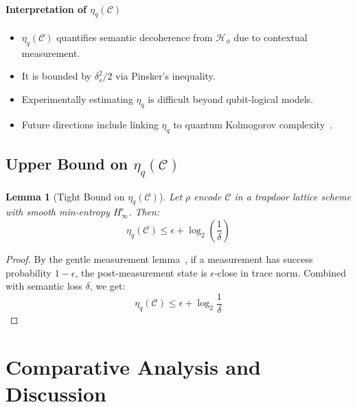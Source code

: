 \documentclass[preprint,12pt]{elsarticle}
\newtheorem{lemma}{Lemma}[section]
\begin{document}
            \paragraph{Interpretation of $\eta_q(\mathcal{C})$}
            \begin{itemize}
                \item $\eta_q(\mathcal{C})$ quantifies semantic decoherence from $\mathcal{H}_\phi$ due to contextual measurement.
                \item It is bounded by $\delta_s^2 / 2$ via Pinsker's inequality.
                \item Experimentally estimating $\eta_q$ is difficult beyond qubit-logical models.
                \item Future directions include linking $\eta_q$ to quantum Kolmogorov complexity~\cite{Berthiaume1997}.
            \end{itemize}

            \subsection{Upper Bound on $\eta_q(\mathcal{C})$}

            \begin{lemma}[Tight Bound on $\eta_q(\mathcal{C})$] \label{lem:tight_quantum_bound} 
                Let $\rho$ encode $\mathcal{C}$ in a trapdoor lattice scheme with smooth min-entropy $H_\infty^{\epsilon}$. Then:
                \begin{equation}\label{eq:tight_quantum_bound} 
                    \eta_q(\mathcal{C}) \leq \epsilon + \log_2 \left(\frac{1}{\delta}\right)
                \end{equation}
            \end{lemma}

            \begin{proof}\label{pr:tight_quantum_bound} 
                By the gentle measurement lemma~\cite{Wilde2017}, if a measurement has success probability $1-\epsilon$, the post-measurement state is $\epsilon$-close in trace norm. Combined with semantic loss $\delta$, we get:
                \begin{equation}\label{eq:pr_tight_quantum_bound} 
                    \eta_q(\mathcal{C}) \leq \epsilon + \log_2 \frac{1}{\delta}
                \end{equation}
            \end{proof}

    \section{Comparative Analysis and Discussion}\label{sec:discussion}
\end{document}
